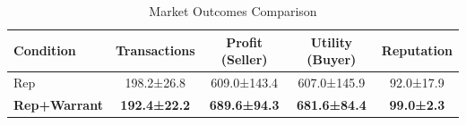 \begin{table}[t]
    \centering
    \caption{Market Outcomes Comparison}
    \label{tab:market_comparison}
    \begin{tabular}{lcccc}
    \toprule
    \textbf{Condition} & \textbf{Transactions} & \textbf{Profit (Seller)} & \textbf{Utility (Buyer)} & \textbf{Reputation} \\
    \midrule
    Rep & 198.2±26.8 & 609.0±143.4 & 607.0±145.9 & 92.0±17.9 \\
    \textbf{Rep+Warrant} & \textbf{192.4±22.2} & \textbf{689.6±94.3} & \textbf{681.6±84.4} & \textbf{99.0±2.3} \\
    \bottomrule
    \end{tabular}
\end{table}
